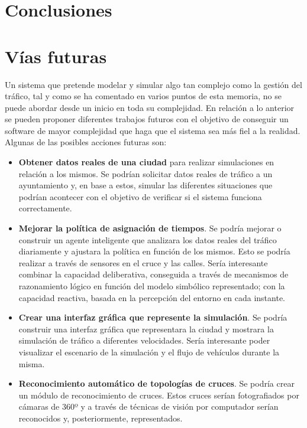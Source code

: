 \chapter{Conclusiones}
    \label{chap:eight}

\chapter{Vías futuras}
    \label{chap:nine}
Un sistema que pretende modelar y simular algo tan complejo como la gestión del tráfico, tal y como se ha comentado en varios puntos de esta memoria, no se puede abordar desde un inicio en toda su complejidad. En relación a lo anterior se pueden proponer diferentes trabajos futuros con el objetivo de conseguir un software de mayor complejidad que haga que el sistema sea más fiel a la realidad. Algunas de las posibles acciones futuras son:
\begin{itemize}
    \item\textbf{Obtener datos reales de una ciudad} para realizar simulaciones en relación a los mismos. Se podrían solicitar datos reales de tráfico a un ayuntamiento y, en base a estos, simular las diferentes situaciones que podrían acontecer con el objetivo de verificar si el sistema funciona correctamente.
    \item \textbf{Mejorar la política de asignación de tiempos}. Se podría mejorar o construir un agente inteligente que analizara los datos reales del tráfico diariamente y ajustara la política en función de los mismos. Esto se podría realizar a través de sensores en el cruce y las calles. Sería interesante combinar la capacidad deliberativa, conseguida a través de mecanismos de razonamiento lógico en función del modelo simbólico representado; con la capacidad reactiva, basada en la percepción del entorno en cada instante.
    \item \textbf{Crear una interfaz gráfica que represente la simulación}. Se podría construir una interfaz gráfica que representara la ciudad y mostrara la simulación de tráfico a diferentes velocidades. Sería interesante poder visualizar el escenario de la simulación y el flujo de vehículos durante la misma.
    \item \textbf{Reconocimiento automático de topologías de cruces}. Se podría crear un módulo de reconocimiento de cruces. Estos cruces serían fotografiados por cámaras de 360º y a través de técnicas de visión por computador serían reconocidos y, posteriormente, representados.
\end{itemize}
